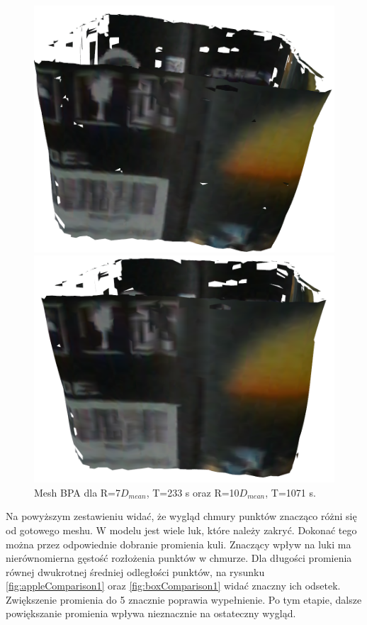 \begin{figure}[H]
\centering
    \begin{minipage}[b]{0.45\linewidth}
        \includegraphics[scale=0.3]{bpaBox7x.PNG}
    \end{minipage}
\quad
    \begin{minipage}[b]{0.45\linewidth}
        \includegraphics[scale=0.3]{bpaBox10x.PNG}
    \end{minipage}
\caption{Mesh BPA dla R=7$D_{mean}$, T=233 s oraz R=10$D_{mean}$, T=1071 s.}
\label{fig:boxComparison2}
\end{figure}
Na powyższym zestawieniu widać, że wygląd chmury punktów znacząco różni się od gotowego meshu. W modelu jest wiele luk, które należy zakryć. Dokonać tego można przez odpowiednie dobranie promienia kuli. Znaczący wpływ na luki ma nierównomierna gęstość rozłożenia punktów w chmurze. Dla długości promienia równej dwukrotnej średniej odległości punktów, na rysunku \ref{fig:appleComparison1} oraz \ref{fig:boxComparison1} widać znaczny ich odsetek. Zwiększenie promienia do 5 znacznie poprawia wypełnienie. Po tym etapie, dalsze powiększanie promienia wpływa nieznacznie na ostateczny wygląd.


